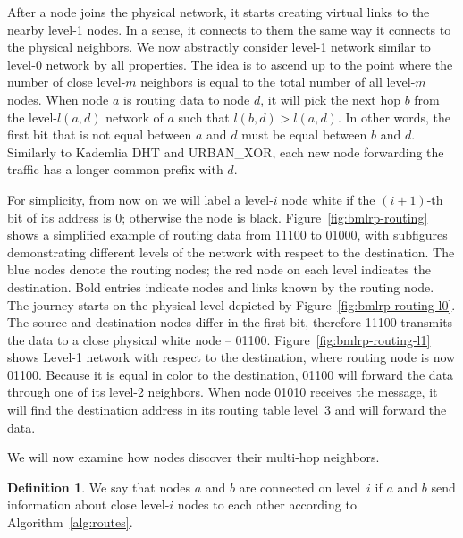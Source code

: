 \documentclass[conference]{IEEEtran}
\theoremstyle{definition}
\newtheorem{defn}{Definition}
\newcommand{\urbanxor}{URBAN\_XOR}
\begin{document}
After a node joins the physical network, it starts creating virtual links to the nearby level-1 nodes. In a sense, it connects to them the same way it connects to the physical neighbors. We now abstractly consider level-1 network similar to level-0 network by all properties. The idea is to ascend up to the point where the number of close level-$m$ neighbors is equal to the total number of all level-$m$ nodes. When node $a$ is routing data to node $d$, it will pick the next hop $b$ from the level-$l(a,d)$ network of $a$ such that $l(b,d) > l(a,d)$. In other words, the first bit that is not equal between $a$ and $d$ must be equal between $b$ and $d$. Similarly to Kademlia DHT and \urbanxor, each new node forwarding the traffic has a
longer common prefix with $d$.

For simplicity, from now on we will label a level-$i$ node white if the $(i+1)$-th bit of its address is 0; otherwise the node is black.
Figure~\ref{fig:bmlrp-routing} shows a simplified example of routing data from 11100 to 01000, with subfigures demonstrating different levels of the network with respect to the destination. The blue nodes denote the routing nodes; the red node on each level indicates the destination. Bold entries indicate nodes and links known by the routing node. The journey starts on the physical level depicted by Figure~\ref{fig:bmlrp-routing-l0}. The source and destination nodes differ in the first bit, therefore 11100 transmits the data to a close physical white node -- 01100. Figure~\ref{fig:bmlrp-routing-l1} shows Level-1 network with respect to the destination, where routing node is now 01100. Because it is equal in color to the destination, 01100 will forward the data through one of its level-2 neighbors. When node 01010 receives the message, it will find the destination address in its routing table level~3 and will forward the data.



We will now examine how nodes discover their multi-hop neighbors.

\begin{defn}
    We say that nodes $a$ and $b$ are connected on level~$i$ if $a$ and $b$ send information about close level-$i$ nodes to each other according to Algorithm~\ref{alg:routes}.
    
    \label{defn:connected}
\end{defn}
\end{document}
